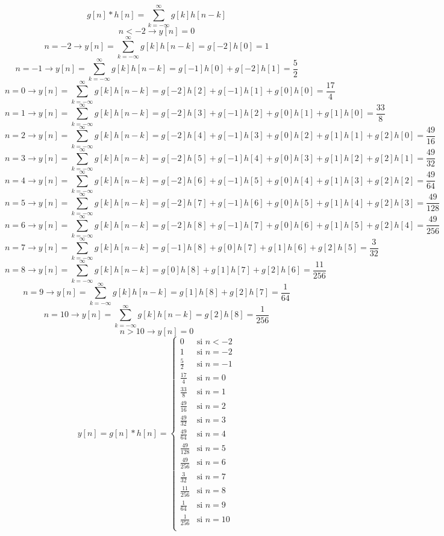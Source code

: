 \documentclass[10pt,a4paper]{article}
\begin{document}
\begin{center}
\begin{enumerate}
$$g[n]*h[n]=\sum_{k=-\infty}^{\infty}g[k]h[n-k]$$
$$n<-2 \rightarrow y[n]=0 $$
$$n=-2 \rightarrow y[n]=\sum_{k=-\infty}^{\infty}g[k]h[n-k]=g[-2]h[0]=1 $$
$$n=-1 \rightarrow y[n]= \sum_{k=-\infty}^{\infty}g[k]h[n-k]=g[-1]h[0]+g[-2]h[1]=\frac{5}{2} $$
$$n=0 \rightarrow y[n]= \sum_{k=-\infty}^{\infty}g[k]h[n-k]=g[-2]h[2]+g[-1]h[1]+g[0]h[0]=\frac{17}{4} $$
$$n=1 \rightarrow y[n]= \sum_{k=-\infty}^{\infty}g[k]h[n-k]=g[-2]h[3]+g[-1]h[2]+g[0]h[1]+g[1]h[0]=\frac{33}{8} $$
$$n=2 \rightarrow y[n]= \sum_{k=-\infty}^{\infty}g[k]h[n-k]=g[-2]h[4]+g[-1]h[3]+g[0]h[2]+g[1]h[1]+g[2]h[0]=\frac{49}{16} $$
$$n=3 \rightarrow y[n]= \sum_{k=-\infty}^{\infty}g[k]h[n-k]=g[-2]h[5]+g[-1]h[4]+g[0]h[3]+g[1]h[2]+g[2]h[1] =\frac{49}{32}$$
$$n=4 \rightarrow y[n]= \sum_{k=-\infty}^{\infty}g[k]h[n-k]=g[-2]h[6]+g[-1]h[5]+g[0]h[4]+g[1]h[3]+g[2]h[2]=\frac{49}{64} $$
$$n=5 \rightarrow y[n]= \sum_{k=-\infty}^{\infty}g[k]h[n-k]=g[-2]h[7]+g[-1]h[6]+g[0]h[5]+g[1]h[4]+g[2]h[3]=\frac{49}{128} $$
$$n=6 \rightarrow y[n]= \sum_{k=-\infty}^{\infty}g[k]h[n-k]=g[-2]h[8]+g[-1]h[7]+g[0]h[6]+g[1]h[5]+g[2]h[4]=\frac{49}{256} $$
$$n=7 \rightarrow y[n]= \sum_{k=-\infty}^{\infty}g[k]h[n-k]=g[-1]h[8]+g[0]h[7]+g[1]h[6]+g[2]h[5]=\frac{3}{32} $$
$$n=8 \rightarrow y[n]= \sum_{k=-\infty}^{\infty}g[k]h[n-k]=g[0]h[8]+g[1]h[7]+g[2]h[6] =\frac{11}{256}$$
$$n=9 \rightarrow y[n]= \sum_{k=-\infty}^{\infty}g[k]h[n-k]=g[1]h[8]+g[2]h[7]=\frac{1}{64} $$
$$n=10 \rightarrow y[n]= \sum_{k=-\infty}^{\infty}g[k]h[n-k]=g[2]h[8]=\frac{1}{256}$$
$$n>10 \rightarrow y[n]=0 $$
\begin{equation*}
y[n]=g[n]*h[n] =
\begin{cases}
0 & \text{si $n<-2 $}\\
1 & \text{si $n= -2$}\\
\frac{5}{2} & \text{si $n= -1$}\\
\frac{17}{4} & \text{si $n= 0$}\\
\frac{33}{8} & \text{si $n= 1$}\\
\frac{49}{16} & \text{si $n= 2$}\\
\frac{49}{32} & \text{si $n= 3$}\\
\frac{49}{64} & \text{si $n=4$}\\
\frac{49}{128} & \text{si $n=5$}\\
\frac{49}{256} & \text{si $n=6$}\\
\frac{3}{32} & \text{si $n=7$}\\
\frac{11}{256} & \text{si $n=8$}\\
\frac{1}{64} & \text{si $n=9$}\\
\frac{1}{256} & \text{si $n=10$}\\

\end{cases}
\end{equation*}
\end{enumerate}
\end{center}
\end{document}
